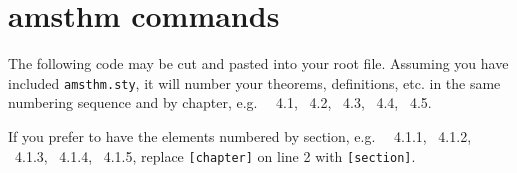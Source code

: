 
\chapter{amsthm commands}
\label{amsthmcommands}

The following code may be cut and pasted into your root file. Assuming you have included \verb"amsthm.sty", it will number your theorems, definitions, etc. in the same numbering sequence and by chapter, e.g.~%
\mbox{\textsc{} 4.1},
\mbox{\textsc{} 4.2},
\mbox{\textsc{} 4.3},
\mbox{\textsc{} 4.4},
\mbox{\textsc{} 4.5}.

If you prefer to have the elements numbered by section, e.g.~%
\mbox{\textsc{} 4.1.1},
\mbox{\textsc{} 4.1.2},
\mbox{\textsc{} 4.1.3},
\mbox{\textsc{} 4.1.4},
\mbox{\textsc{} 4.1.5}, replace \verb"[chapter]" on line 2 with \verb"[section]".

\begin{smallverbatim}

  \theoremstyle{plain}%
  \newtheorem{theorem}{Theorem}[chapter]
  \newtheorem{lemma}[theorem]{Lemma}
  \newtheorem{corollary}[theorem]{Corollary}
  \newtheorem{proposition}[theorem]{Proposition}
  \newtheorem{conjecture}[theorem]{Conjecture}
  \newtheorem{criterion}[theorem]{Criterion}
  \newtheorem{algorithm}[theorem]{Algorithm}

  \theoremstyle{definition}
  \newtheorem{definition}[theorem]{Definition}
  \newtheorem{condition}[theorem]{Condition}

  \theoremstyle{remark}
  \newtheorem{remark}{Remark}[chapter]
  \newtheorem{note}[remark]{Note}
  \newtheorem{notation}[remark]{Notation}
  \newtheorem{claim}[remark]{Claim}
  \newtheorem{summary}[remark]{Summary}
  \newtheorem{acknowledgement}[remark]{Acknowledgement}
  \newtheorem{case}[remark]{Case}
  \newtheorem{conclusion}[remark]{Conclusion}
\end{smallverbatim}

\endinput